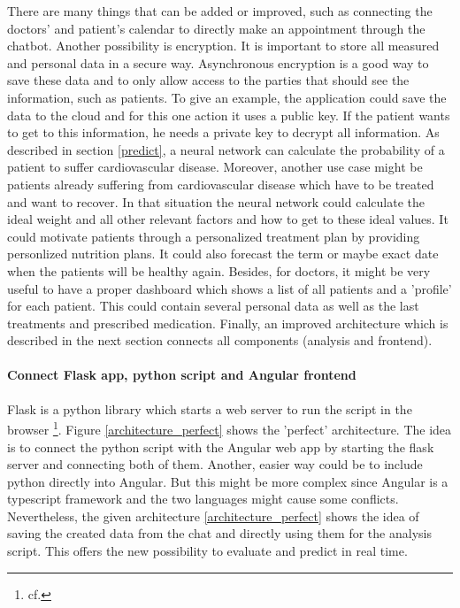 There are many things that can be added or improved, such as connecting the doctors' and patient's calendar to directly make an appointment through the chatbot.
Another possibility is encryption. It is important to store all measured and personal data in a secure way. Asynchronous encryption is a good way to save these data and to only allow access to the parties that should see the information, such as patients. To give an example, the application could save the data to the cloud and for this one action it uses a public key. If the patient wants to get to this information, he needs a private key to decrypt all information. 
As described in section \ref{predict}, a neural network can calculate the probability of a patient to suffer cardiovascular disease.
Moreover, another use case might be patients already suffering from cardiovascular disease which have to be treated and want to recover. In that situation the neural network could calculate the ideal weight and all other relevant factors and how to get to these ideal values. It could motivate patients through a personalized treatment plan by providing personlized nutrition plans. It could also forecast the term or maybe exact date  when the patients will be healthy again.
Besides, for doctors, it might be very useful to have a proper dashboard which shows a list of all patients and a 'profile' for each patient. This could contain several personal data as well as the last treatments and prescribed medication. 
Finally, an improved architecture which is described in the next section connects all components (analysis and frontend).

\paragraph{Connect Flask app, python script and Angular frontend}
Flask is a python library which starts a web server to run the script in the browser \footnote{cf.\autocite{flask}}.
Figure \ref{architecture_perfect} shows the 'perfect' architecture. The idea is to connect the python script with the Angular web app by starting the flask server and connecting both of them. Another, easier way could be to include python directly into Angular. But this might be more complex since Angular is a typescript framework and the two languages might cause some conflicts. 
Nevertheless, the given architecture \ref{architecture_perfect} shows the idea of saving the created data from the chat and directly using them for the analysis script. This offers the new possibility to evaluate and predict in real time.


